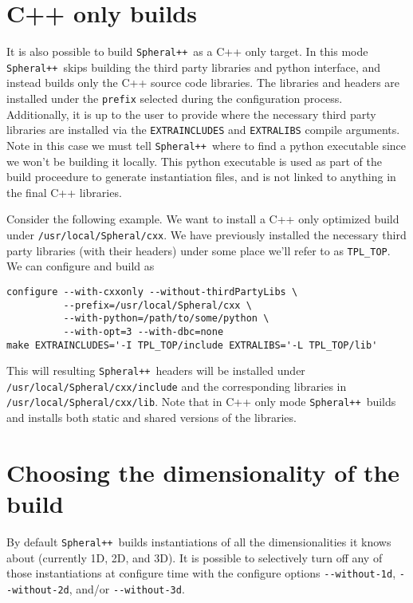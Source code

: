 \documentclass{article}
\newcommand{\Spheral}{{\tt Spheral++}}
\begin{document}
\section{C++ only builds}

It is also possible to build \Spheral\ as a C++ only target.  In this mode \Spheral\ skips building the third party libraries and python interface, and instead builds only the C++ source code libraries.  The libraries and headers are installed under the \verb.prefix. selected during the configuration process.  Additionally, it is up to the user to provide where the necessary third party libraries are installed via the \verb.EXTRAINCLUDES. and \verb.EXTRALIBS. compile arguments.  Note in this case we must tell \Spheral\ where to find a python executable since we won't be building it locally.  This python executable is used as part of the build proceedure to generate instantiation files, and is not linked to anything in the final C++ libraries.

Consider the following example.  We want to install a C++ only optimized build under \verb./usr/local/Spheral/cxx..  We have previously installed the necessary third party libraries (with their headers) under some place we'll refer to as \verb.TPL_TOP..  We can configure and build as

\begin{verbatim}
configure --with-cxxonly --without-thirdPartyLibs \ 
          --prefix=/usr/local/Spheral/cxx \ 
          --with-python=/path/to/some/python \
          --with-opt=3 --with-dbc=none 
make EXTRAINCLUDES='-I TPL_TOP/include EXTRALIBS='-L TPL_TOP/lib'
\end{verbatim}

This will resulting \Spheral\ headers will be installed under \verb./usr/local/Spheral/cxx/include. and the corresponding libraries in \verb./usr/local/Spheral/cxx/lib..  Note that in C++ only mode \Spheral\ builds and installs both static and shared versions of the libraries.

\section{Choosing the dimensionality of the build}

By default \Spheral\ builds instantiations of all the dimensionalities it knows about (currently 1D, 2D, and 3D).  It is possible to selectively turn off any of those instantiations at configure time with the configure options \verb.--without-1d., \verb.--without-2d., and/or \verb.--without-3d..
\end{document}
